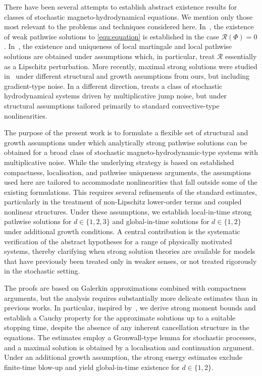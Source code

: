 \documentclass[11pt, reqno]{amsart}
\theoremstyle{definition}
\numberwithin{equation}{section}
\begin{document}
There have been several attempts to establish abstract existence results for classes of stochastic magneto-hydrodynamical equations. We mention only those most relevant to the problems and techniques considered here. In~\cite{ChuMil10}, the existence of weak pathwise solutions to \eqref{equ:equation} is established in the case $\mathcal{R}(\Phi)=0$. In~\cite{DebGlaTem11}, the existence and uniqueness of local martingale and local pathwise solutions are obtained under assumptions which, in particular, treat $\mathcal{R}$ essentially as a Lipschitz perturbation. More recently, maximal strong solutions were studied in~\cite{GooCriLan24} under different structural and growth assumptions from ours, but including gradient-type noise. In a different direction, \cite{BesHauRaz15} treats a class of stochastic hydrodynamical systems driven by multiplicative jump noise, but under structural assumptions tailored primarily to standard convective-type nonlinearities.

The purpose of the present work is to formulate a flexible set of structural and growth assumptions under which analytically strong pathwise solutions can be obtained for a broad class of stochastic magneto-hydrodynamic-type systems with multiplicative noise. While the underlying strategy is based on established compactness, localisation, and pathwise uniqueness arguments, the assumptions used here are tailored to accommodate nonlinearities that fall outside some of the existing formulations. This requires
several refinements of the standard estimates, particularly in the treatment
of non-Lipschitz lower-order terms and coupled nonlinear structures. Under these assumptions, we establish local-in-time strong pathwise solutions for $d\in\{1,2,3\}$ and global-in-time solutions for $d\in\{1,2\}$ under additional growth conditions. A central contribution is the systematic verification of the abstract hypotheses for a range of physically motivated systems, thereby clarifying when strong solution theories are available for models that have previously been treated only in weaker senses, or not treated rigorously in the stochastic setting.


The proofs are based on Galerkin approximations combined with compactness arguments, but the analysis requires substantially more delicate estimates than in previous works. In particular, inspired by~\cite{GlaZia09, GlaTem11}, we derive strong moment bounds and establish a Cauchy property for the approximate solutions up to a suitable stopping time, despite the absence of any inherent cancellation structure in the equations. The estimates employ a Gronwall-type lemma for stochastic processes, and a maximal solution is
obtained by a localisation and continuation argument. Under an additional growth assumption, the strong energy estimates exclude finite-time blow-up and yield global-in-time existence for $d\in \{1,2\}$.
\end{document}
